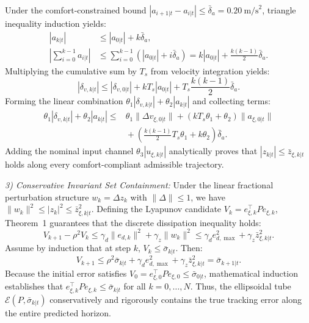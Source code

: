 \documentclass[journal]{IEEEtran}
\begin{document}
\begin{IEEEproof}
\begin{enumerate}
\end{enumerate}
Under the comfort-constrained bound $|a_{i+1|t} - a_{i|t}| \le \bar\delta_a = 0.20~\text{m/s}^2$, triangle inequality induction yields:
\begin{align}
|a_{k|t}| &\le |a_{0|t}| + k \bar\delta_a, \\
\left|\sum_{i=0}^{k-1} a_{i|t}\right| &\le \sum_{i=0}^{k-1} (|a_{0|t}| + i \bar\delta_a) = k |a_{0|t}| + \frac{k(k-1)}{2} \bar\delta_a.
\end{align}
Multiplying the cumulative sum by $T_s$ from velocity integration yields:
\begin{equation}
|\delta_{v,k|t}| \le |\delta_{v,0|t}| + k T_s |a_{0|t}| + T_s \frac{k(k-1)}{2} \bar\delta_a.
\end{equation}
Forming the linear combination $\theta_1 |\delta_{v,k|t}| + \theta_2 |a_{k|t}|$ and collecting terms:
\begin{align}
\theta_1 |\delta_{v,k|t}| + \theta_2 |a_{k|t}| \le{}& \theta_1 \|\Delta v_{\xi,0|t}\| + (k T_s \theta_1 + \theta_2) \|a_{\xi,0|t}\| \nonumber \\
&{}+ \left(\frac{k(k-1)}{2} T_s \theta_1 + k \theta_2\right) \bar\delta_a.
\end{align}
Adding the nominal input channel $\theta_3 |u_{\xi,k|t}|$ analytically proves that $|z_{k|t}| \le \bar z_{\xi,k|t}$ holds along every comfort-compliant admissible trajectory.

\emph{3) Conservative Invariant Set Containment:} Under the linear fractional perturbation structure $w_k = \Delta z_k$ with $\|\Delta\| \le 1$, we have $\|w_k\|^2 \le |z_k|^2 \le \bar z_{\xi,k|t}^2$. Defining the Lyapunov candidate $V_k = e_{\xi,k}^\top P e_{\xi,k}$, Theorem~1 guarantees that the discrete dissipation inequality holds:
\begin{equation}
V_{k+1} - \rho^2 V_k \le \gamma_d \|e_{d,k}\|^2 + \gamma_z \|w_k\|^2 \le \gamma_d e_{d,\max}^2 + \gamma_z \bar z_{\xi,k|t}^2.
\end{equation}
Assume by induction that at step $k$, $V_k \le \bar\sigma_{k|t}$. Then:
\begin{equation}
V_{k+1} \le \rho^2 \bar\sigma_{k|t} + \gamma_d e_{d,\max}^2 + \gamma_z \bar z_{\xi,k|t}^2 = \bar\sigma_{k+1|t}.
\end{equation}
Because the initial error satisfies $V_0 = e_{\xi,0}^\top P e_{\xi,0} \le \bar\sigma_{0|t}$, mathematical induction establishes that $e_{\xi,k}^\top P e_{\xi,k} \le \bar\sigma_{k|t}$ for all $k = 0, \ldots, N$. Thus, the ellipsoidal tube $\mathcal{E}(P, \bar\sigma_{k|t})$ conservatively and rigorously contains the true tracking error along the entire predicted horizon.
\end{IEEEproof}
\end{document}
